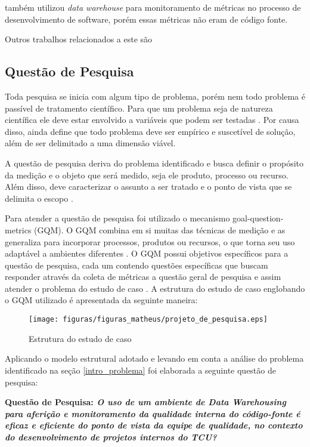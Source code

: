  também utilizou \textit{data warehouse} para monitoramento de métricas no processo de desenvolvimento de software, porém essas métricas não eram de código fonte.

Outros trabalhos relacionados a este são 



\subsection{Questão de Pesquisa}

Toda pesquisa se inicia com algum tipo de problema, porém nem todo problema é passível de tratamento científico. Para que um problema seja de natureza científica ele deve estar envolvido a variáveis que podem ser testadas \cite{gil_como_2002}. Por causa disso,  ainda define que todo problema deve ser empírico e suscetível de solução, além de ser delimitado a uma dimensão viável.

A questão de pesquisa deriva do problema identificado e busca definir o propósito da medição e o objeto que será medido, seja ele produto, processo ou recurso. Além disso, deve caracterizar o assunto a ser tratado e o ponto de vista que se delimita o escopo \cite{Basili96b} \cite{caldiera_goal_1994}.

Para atender a questão de pesquisa foi utilizado o mecanismo goal-question-metrics (GQM). O GQM combina em si muitas das técnicas de medição e as generaliza para incorporar processos, produtos ou recursos, o que torna seu uso adaptável a ambientes diferentes \cite{caldiera_goal_1994}. O GQM possui objetivos específicos para a questão de pesquisa, cada um contendo questões específicas que buscam responder através da coleta de métricas a questão geral de pesquisa e assim atender o problema do estudo de caso \cite{Basili96b}. A estrutura do estudo de caso englobando o GQM utilizado é apresentada da seguinte maneira:  

\begin{figure}[h!]
\centering
\texttt{[image: figuras/figuras\_matheus/projeto\_de\_pesquisa.eps]}
\caption{Estrutura do estudo de caso}
\label{fig:pesquisa}
\end{figure}
\FloatBarrier

Aplicando o modelo estrutural adotado e levando em conta a análise do problema identificado na seção \ref{intro_problema} foi elaborada a seguinte questão de pesquisa:

\textbf{Questão de Pesquisa: \textit{O uso de um ambiente de Data Warehousing para aferição e monitoramento da qualidade interna do código-fonte é eficaz e eficiente do ponto de vista da equipe de qualidade, no contexto do desenvolvimento de projetos internos do TCU?}}

